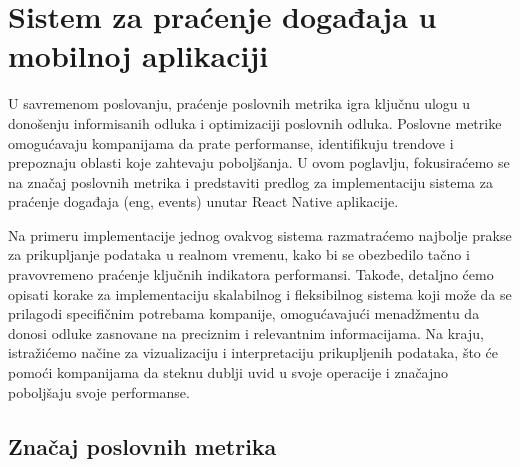 \documentclass[12pt,oneside]{memoir}
\begin{document}
\begin{figure}[!h]
    \centering
    \qquad
\end{figure}

\chapter{Sistem za praćenje događaja u mobilnoj aplikaciji}

U savremenom poslovanju, praćenje poslovnih metrika igra ključnu ulogu u donošenju informisanih odluka i optimizaciji poslovnih odluka. Poslovne metrike omogućavaju kompanijama da prate performanse, identifikuju trendove i prepoznaju oblasti koje zahtevaju poboljšanja. U ovom poglavlju, fokusiraćemo se na značaj poslovnih metrika i predstaviti predlog za implementaciju sistema za praćenje događaja (eng, events) unutar React Native aplikacije.

Na primeru implementacije jednog ovakvog sistema razmatraćemo najbolje prakse za prikupljanje podataka u realnom vremenu, kako bi se obezbedilo tačno i pravovremeno praćenje ključnih indikatora performansi. Takođe, detaljno ćemo opisati korake za implementaciju skalabilnog i fleksibilnog sistema koji može da se prilagodi specifičnim potrebama kompanije, omogućavajući menadžmentu da donosi odluke zasnovane na preciznim i relevantnim informacijama. Na kraju, istražićemo načine za vizualizaciju i interpretaciju prikupljenih podataka, što će pomoći kompanijama da steknu dublji uvid u svoje operacije i značajno poboljšaju svoje performanse.

\section{Značaj poslovnih metrika}
\end{document}
